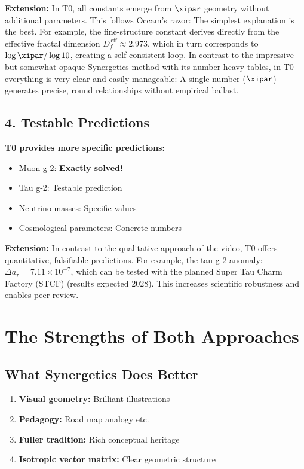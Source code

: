 	\textbf{Extension:} In T0, all constants emerge from $\xipar$ geometry without additional parameters. This follows Occam's razor: The simplest explanation is the best. For example, the fine-structure constant derives directly from the effective fractal dimension $D_f^{\,\text{eff}} \approx 2.973$, which in turn corresponds to $\log \xipar / \log 10$, creating a self-consistent loop. In contrast to the impressive but somewhat opaque Synergetics method with its number-heavy tables, in T0 everything is very clear and easily manageable: A single number ($\xipar$) generates precise, round relationships without empirical ballast.
	
	\subsection{4. Testable Predictions}
	
	\begin{vorteil}
		\textbf{T0 provides more specific predictions:}
		\begin{itemize}
			\item Muon g-2: \textbf{Exactly solved!}
			\item Tau g-2: Testable prediction
			\item Neutrino masses: Specific values
			\item Cosmological parameters: Concrete numbers
		\end{itemize}
		
		\textbf{Extension:} In contrast to the qualitative approach of the video, T0 offers quantitative, falsifiable predictions. For example, the tau g-2 anomaly: $\Delta a_\tau = 7.11 \times 10^{-7}$, which can be tested with the planned Super Tau Charm Factory (STCF) (results expected 2028). This increases scientific robustness and enables peer review.
	\end{vorteil}
	\section{The Strengths of Both Approaches}
	
	\subsection{What Synergetics Does Better}
	
	\begin{enumerate}
		\item \textbf{Visual geometry:} Brilliant illustrations
		\item \textbf{Pedagogy:} Road map analogy etc.
		\item \textbf{Fuller tradition:} Rich conceptual heritage
		\item \textbf{Isotropic vector matrix:} Clear geometric structure
	\end{enumerate}
	
